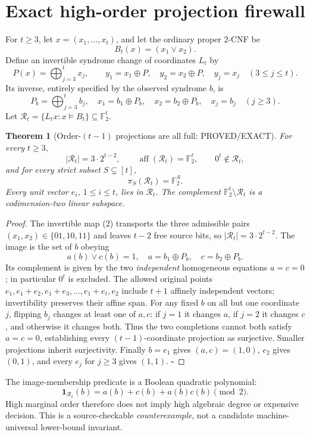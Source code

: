 \documentclass[11pt]{article}
\newtheorem{theorem}{Theorem}
\begin{document}
\section{Exact high-order projection firewall}
For \(t\ge3\), let \(x=(x_1,\ldots,x_t)\), and let the ordinary proper 2-CNF be
\[
B_t(x)=(x_1\lor x_2).
\]
Define an invertible syndrome change of coordinates \(L_t\) by
\[
P(x)=\bigoplus_{j=3}^t x_j,\qquad
y_1=x_1\oplus P,\quad y_2=x_2\oplus P,\quad
y_j=x_j\quad(3\le j\le t).                  \tag{2}
\]
Its inverse, entirely specified by the observed syndrome \(b\), is
\[
P_b=\bigoplus_{j=3}^tb_j,\quad
x_1=b_1\oplus P_b,\quad x_2=b_2\oplus P_b,\quad
x_j=b_j\quad(j\ge3).                       \tag{3}
\]
Let \(\mathcal R_t=\{L_t x:x\models B_t\}\subseteq\mathbb F_2^t\).

\begin{theorem}[Order-\((t-1)\) projections are all full: PROVED/EXACT]
For every \(t\ge3\),
\[
|\mathcal R_t|=3\cdot2^{t-2},\qquad
\operatorname{aff}(\mathcal R_t)=\mathbb F_2^t,\qquad
0^t\notin\mathcal R_t,                           \tag{4}
\]
and for \emph{every} strict subset \(S\subsetneq[t]\),
\[
\pi_S(\mathcal R_t)=\mathbb F_2^{S}.             \tag{5}
\]
Every unit vector \(e_i\), \(1\le i\le t\), lies in \(\mathcal R_t\). The complement \(\mathbb F_2^t\setminus\mathcal R_t\) is a codimension-two linear subspace.
\end{theorem}
\begin{proof}
The invertible map (2) transports the three admissible pairs
\((x_1,x_2)\in\{01,10,11\}\) and leaves \(t-2\) free source bits, so
\(|\mathcal R_t|=3\cdot2^{t-2}\). The image is the set of \(b\) obeying
\[
a(b)\lor c(b)=1,\quad
a=b_1\oplus P_b,\quad c=b_2\oplus P_b.         \tag{6}
\]
Its complement is given by the two \emph{independent} homogeneous equations
\(a=c=0\); in particular \(0^t\) is excluded. The allowed original points
\(e_1,e_1+e_2,e_1+e_3,\ldots,e_1+e_t,e_2\)
include \(t+1\) affinely independent vectors; invertibility preserves their
affine span. For any fixed \(b\) on all but one coordinate \(j\), flipping
\(b_j\) changes at least one of \(a,c\): if \(j=1\) it changes \(a\), if \(j=2\)
it changes \(c\), and otherwise it changes both. Thus the two completions
cannot both satisfy \(a=c=0\), establishing every \((t-1)\)-coordinate
projection as surjective. Smaller projections inherit surjectivity. Finally
\(b=e_1\) gives \((a,c)=(1,0)\), \(e_2\) gives \((0,1)\), and every \(e_j\) for
\(j\ge3\) gives \((1,1)\). \(\square\)
\end{proof}
The image-membership predicate is a Boolean quadratic polynomial:
\[
\mathbf1_{\mathcal R_t}(b)=a(b)+c(b)+a(b)c(b)\pmod2.  \tag{7}
\]
High marginal order therefore does not imply high algebraic degree or expensive decision. This is a source-checkable \emph{counterexample}, not a candidate machine-universal lower-bound invariant.
\end{document}
